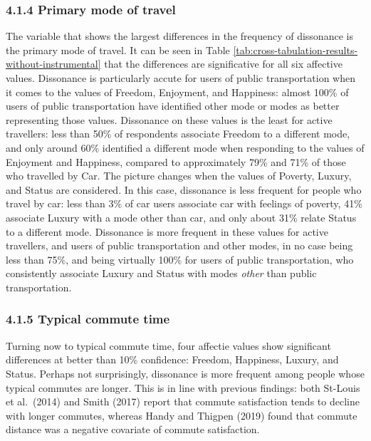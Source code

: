 \documentclass[]{elsarticle} %
\begin{document}
\hypertarget{primary-mode-of-travel}{%
\subsubsection{4.1.4 Primary mode of
travel}\label{primary-mode-of-travel}}

The variable that shows the largest differences in the frequency of
dissonance is the primary mode of travel. It can be seen in Table
\ref{tab:cross-tabulation-results-without-instrumental} that the
differences are significative for all six affective values. Dissonance
is particularly accute for users of public transportation when it comes
to the values of Freedom, Enjoyment, and Happiness: almost 100\% of
users of public transportation have identified other mode or modes as
better representing those values. Dissonance on these values is the
least for active travellers: less than 50\% of respondents associate
Freedom to a different mode, and only around 60\% identified a different
mode when responding to the values of Enjoyment and Happiness, compared
to approximately 79\% and 71\% of those who travelled by Car. The
picture changes when the values of Poverty, Luxury, and Status are
considered. In this case, dissonance is less frequent for people who
travel by car: less than 3\% of car users associate car with feelings of
poverty, 41\% associate Luxury with a mode other than car, and only
about 31\% relate Status to a different mode. Dissonance is more
frequent in these values for active travellers, and users of public
transportation and other modes, in no case being less than 75\%, and
being virtually 100\% for users of public transportation, who
consistently associate Luxury and Status with modes \emph{other} than
public transportation.

\hypertarget{typical-commute-time}{%
\subsubsection{4.1.5 Typical commute time}\label{typical-commute-time}}

Turning now to typical commute time, four affectie values show
significant differences at better than 10\% confidence: Freedom,
Happiness, Luxury, and Status. Perhaps not surprisingly, dissonance is
more frequent among people whose typical commutes are longer. This is in
line with previous findings: both St-Louis et al.~(2014) and Smith
(2017) report that commute satisfaction tends to decline with longer
commutes, whereas Handy and Thigpen (2019) found that commute distance
was a negative covariate of commute satisfaction.
\end{document}
